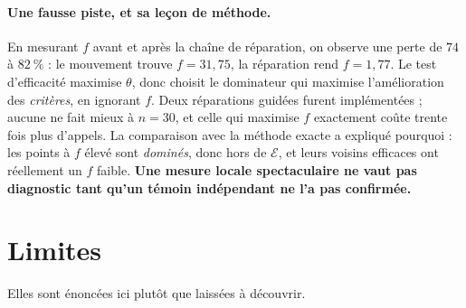 \documentclass[11pt,a4paper]{article}
\theoremstyle{plain}
\theoremstyle{remark}
\newcommand{\Ecal}{\mathcal{E}}
\begin{document}
\paragraph{Une fausse piste, et sa leçon de méthode.} En mesurant $f$ avant
et après la chaîne de réparation, on observe une perte de $74$ à $82\ \%$ :
le mouvement trouve $f=31{,}75$, la réparation rend $f=1{,}77$. Le test
d'efficacité maximise $\theta$, donc choisit le dominateur qui maximise
l'amélioration des \emph{critères}, en ignorant $f$. Deux réparations guidées
furent implémentées ; aucune ne fait mieux à $n=30$, et celle qui maximise
$f$ exactement coûte trente fois plus d'appels. La comparaison avec la
méthode exacte a expliqué pourquoi : les points à $f$ élevé sont
\emph{dominés}, donc hors de $\Ecal$, et leurs voisins efficaces ont
réellement un $f$ faible. \textbf{Une mesure locale spectaculaire ne vaut pas
diagnostic tant qu'un témoin indépendant ne l'a pas confirmée.}

\section{Limites}

Elles sont énoncées ici plutôt que laissées à découvrir.
\end{document}
